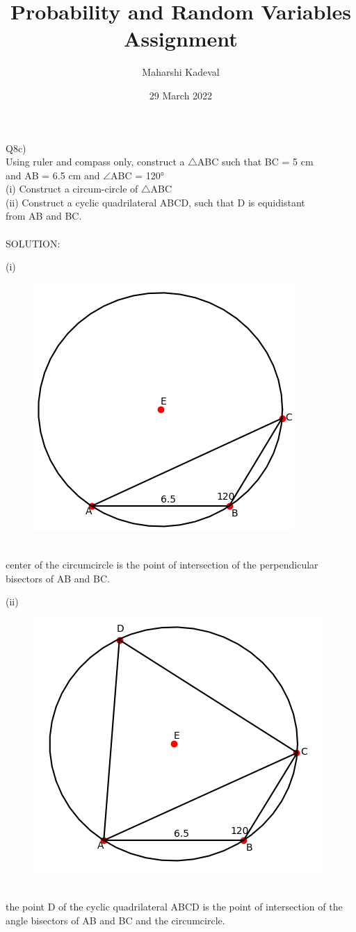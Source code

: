 \documentclass[12pt,a4paper,twocolumn]{article}
\title{Probability and Random Variables Assignment}
\author{Maharshi Kadeval}
\date{29 March 2022}
\begin{document}
\maketitle

Q8c)\\
Using ruler and compass only, construct a $\bigtriangleup$ABC such that BC = 5 cm\\
and AB = 6.5 cm and $\angle$ABC = 120°\\
(i) Construct a circum-circle of $\bigtriangleup$ABC\\
(ii) Construct a cyclic quadrilateral ABCD, such that D is equidistant\\
from AB and BC.\\\\
SOLUTION:

(i)
\begin{figure}[!h]
\begin{center}
\includegraphics[scale=0.58]{fig1.png}\\
\end{center}
\end{figure}
\\
center of the circumcircle is the point of intersection of the perpendicular bisectors of AB and BC.

\pagebreak
(ii)
\begin{figure}[!h]
\begin{center}
\includegraphics[scale=0.6]{fig2.png}\\
\end{center}
\end{figure}
\\
the point D of the cyclic quadrilateral ABCD is the point of intersection of the angle 
bisectors of AB and BC and the circumcircle.
\end{document}
